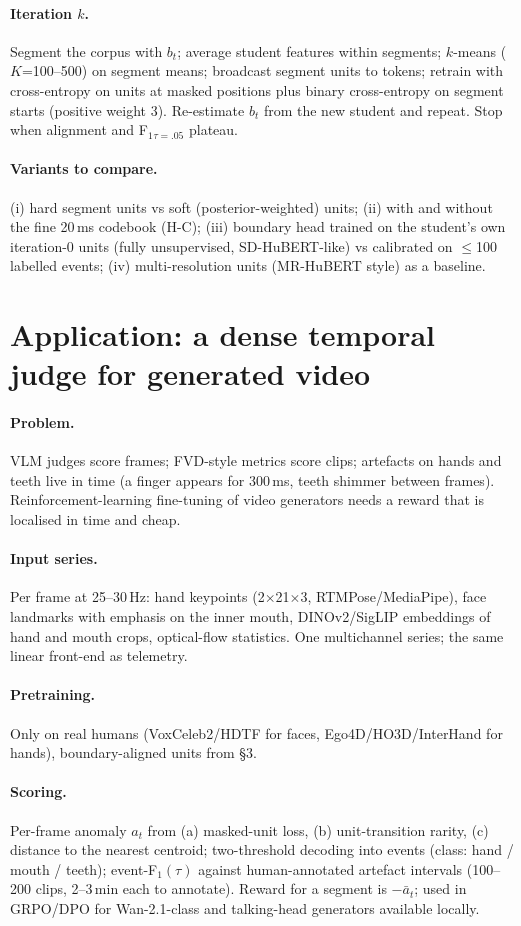 \documentclass[10pt,twocolumn]{article}
\newcommand{\Fone}{F$_1$}
\begin{document}
\paragraph{Iteration $k$.} Segment the corpus with $b_t$; average student features within segments; $k$-means ($K$=100--500) on segment means; broadcast segment units to tokens; retrain with cross-entropy on units at masked positions plus binary cross-entropy on segment starts (positive weight 3). Re-estimate $b_t$ from the new student and repeat. Stop when alignment and \Fone{}$_{\tau=.05}$ plateau.
\paragraph{Variants to compare.} (i) hard segment units vs soft (posterior-weighted) units; (ii) with and without the fine 20\,ms codebook (H-C); (iii) boundary head trained on the student's own iteration-0 units (fully unsupervised, SD-HuBERT-like) vs calibrated on $\le$100 labelled events; (iv) multi-resolution units (MR-HuBERT style) as a baseline.

\section{Application: a dense temporal judge for generated video}
\paragraph{Problem.} VLM judges score frames; FVD-style metrics score clips; artefacts on hands and teeth live in time (a finger appears for 300\,ms, teeth shimmer between frames). Reinforcement-learning fine-tuning of video generators needs a reward that is localised in time and cheap.
\paragraph{Input series.} Per frame at 25--30\,Hz: hand keypoints (2$\times$21$\times$3, RTMPose/MediaPipe), face landmarks with emphasis on the inner mouth, DINOv2/SigLIP embeddings of hand and mouth crops, optical-flow statistics. One multichannel series; the same linear front-end as telemetry.
\paragraph{Pretraining.} Only on real humans (VoxCeleb2/HDTF for faces, Ego4D/HO3D/InterHand for hands), boundary-aligned units from \S3.
\paragraph{Scoring.} Per-frame anomaly $a_t$ from (a) masked-unit loss, (b) unit-transition rarity, (c) distance to the nearest centroid; two-threshold decoding into events (class: hand / mouth / teeth); event-\Fone{}$(\tau)$ against human-annotated artefact intervals (100--200 clips, 2--3\,min each to annotate). Reward for a segment is $-\bar a_t$; used in GRPO/DPO for Wan-2.1-class and talking-head generators available locally.
\end{document}
